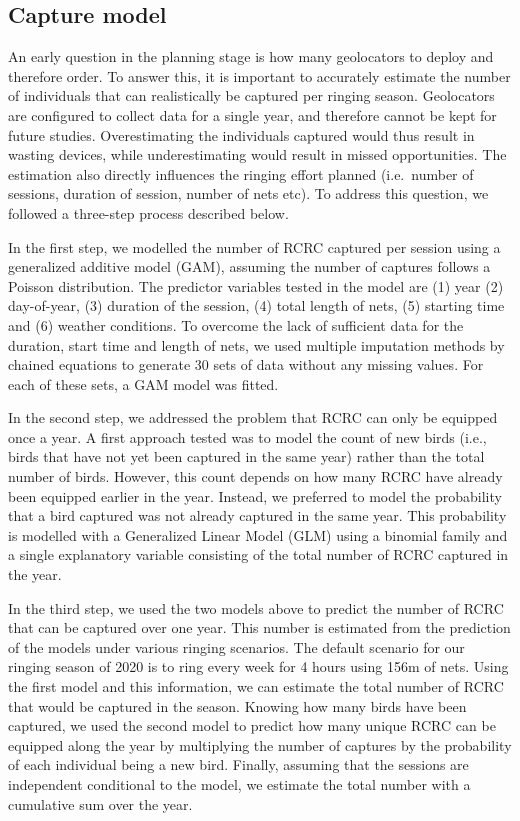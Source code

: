 \documentclass[]{interact}
\theoremstyle{plain}%
\theoremstyle{definition}
\theoremstyle{remark}
\begin{document}
\hypertarget{capture-model}{%
\subsection{Capture model}\label{capture-model}}

An early question in the planning stage is how many geolocators to
deploy and therefore order. To answer this, it is important to
accurately estimate the number of individuals that can realistically be
captured per ringing season. Geolocators are configured to collect data
for a single year, and therefore cannot be kept for future studies.
Overestimating the individuals captured would thus result in wasting
devices, while underestimating would result in missed opportunities. The
estimation also directly influences the ringing effort planned
(i.e.~number of sessions, duration of session, number of nets etc). To
address this question, we followed a three-step process described below.

In the first step, we modelled the number of RCRC captured per session
using a generalized additive model (GAM), assuming the number of
captures follows a Poisson distribution. The predictor variables tested
in the model are (1) year (2) day-of-year, (3) duration of the session,
(4) total length of nets, (5) starting time and (6) weather conditions.
To overcome the lack of sufficient data for the duration, start time and
length of nets, we used multiple imputation methods by chained equations
\citep{Azur2011} to generate 30 sets of data without any missing values.
For each of these sets, a GAM model was fitted.

In the second step, we addressed the problem that RCRC can only be
equipped once a year. A first approach tested was to model the count of
new birds (i.e., birds that have not yet been captured in the same year)
rather than the total number of birds. However, this count depends on
how many RCRC have already been equipped earlier in the year. Instead,
we preferred to model the probability that a bird captured was not
already captured in the same year. This probability is modelled with a
Generalized Linear Model (GLM) using a binomial family and a single
explanatory variable consisting of the total number of RCRC captured in
the year.

In the third step, we used the two models above to predict the number of
RCRC that can be captured over one year. This number is estimated from
the prediction of the models under various ringing scenarios. The
default scenario for our ringing season of 2020 is to ring every week
for 4 hours using 156m of nets. Using the first model and this
information, we can estimate the total number of RCRC that would be
captured in the season. Knowing how many birds have been captured, we
used the second model to predict how many unique RCRC can be equipped
along the year by multiplying the number of captures by the probability
of each individual being a new bird. Finally, assuming that the sessions
are independent conditional to the model, we estimate the total number
with a cumulative sum over the year.
\end{document}
